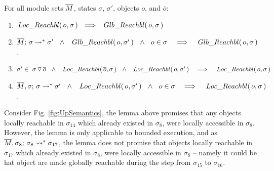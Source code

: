 \begin{lemma}
\label{lemma:relevant}
For all module sets $\overline{M}$, states $\sigma$, $\sigma'$,   objects $o$, and $\overline o$:
\begin{enumerate}
\item
\label{oneGR}
$ \LRelevant o \sigma\ \ \Longrightarrow \ \   \GRelevant o \sigma$
\item
\label{twoGR}
${\leadstoOrigStar {\Mtwo}  {\sigma}  {\sigma'}} \ \ \wedge \ \  \GRelevant o {\sigma'} \ \ \wedge\ \  {o\in \sigma} \ \ \ \Longrightarrow \ \  \ \GRelevant o {\sigma}$.
\item
\label{oneLR}
{$\sigma'\in \PushS {o} {\sigma}  \ \ \wedge \ \  \LRelevant {\overline o} {\sigma} \ \ \wedge\ \   \LRelevant o {\sigma'} \ \ \ \Longrightarrow \ \ \  \LRelevant o {\sigma}$
}
\item
\label{threeLR}
${\overline{M}, \sigma;\, {\sigma} \leadsto^* \sigma'} \ \ \wedge \ \   \,Loc\_Reachbl(\,o,\sigma'\,)\  \ \wedge\ \  {o\in \sigma} \ \ \ \Longrightarrow \ \ \ \,Loc\_Reachbl(\,o,\sigma\,)$.
\end{enumerate}
\end{lemma}

{Consider Fig.  \ref{fig:UpSemantics}, the lemma above promises that any objects locally reachable in $\sigma_{14}$ which already existed in $\sigma_{8}$, were locally accessible in $\sigma_{8}$. However, the lemma is only  applicable to bounded execution, and as 
$\overline{M}, \sigma_8;\, {\sigma_8} \leadsto^* \sigma_{17}$, 
the lemma does not promise that  objects locally reachable in $\sigma_{17}$ which already existed in $\sigma_{8}$, were locally accessible in $\sigma_{8}$ -- namely it could be hat object are made globally reachable during the step from $\sigma_{15}$ to $\sigma_{16}$.}








